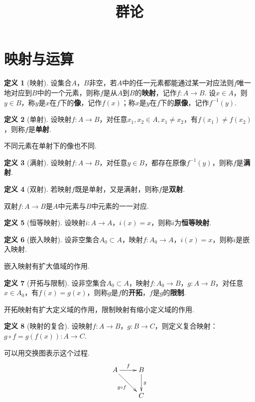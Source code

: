 \documentclass[12pt]{ctexart}
\title{\textbf{群论}}
\date{ }
\theoremstyle{definition}
\newtheorem{definition}{定义}[section]
\theoremstyle{plain}
\begin{document}
	\maketitle
	\tableofcontents
	\newpage
\section{映射与运算}
\begin{definition}[映射]
	设集合$A$，$B$非空，若$A$中的任一元素都能通过某一对应法则$f$唯一地对应到$B$中的一个元素，则称$f$是从$A$到$B$的\textbf{映射}，记作$f:A\to B$. 设$x\in A$，则$y\in B$，称$y$是$x$在$f$下的\textbf{像}，记作$f(x)$；称$x$是$y$在$f$下的\textbf{原像}，记作$f^{-1}(y)$.
\end{definition}
\begin{definition}[单射]
	设映射$f:A\to B$，对任意$x_1,x_2\in A,x_1\neq x_2$，有$f(x_1)\neq f(x_2)$，则称$f$是\textbf{单射}.
\end{definition}
不同元素在单射下的像也不同.
\begin{definition}[满射]
	设映射$f:A\to B$，对任意$y\in B$，都存在原像$f^{-1}(y)$，则称$f$是\textbf{满射}.
\end{definition}
\begin{definition}[双射]
	若映射$f$既是单射，又是满射，则称$f$是\textbf{双射}.
\end{definition}
双射$f:A\to B$是$A$中元素与$B$中元素的一一对应.
\begin{definition}[恒等映射]
	设映射$i:A\to A$，$i(x)=x$，则称$i$为\textbf{恒等映射}.
\end{definition}
\begin{definition}[嵌入映射]
	设非空集合$A_0\subset A$，映射$f:A_0\to A$，$i(x)=x$，则称$i$是嵌入映射.
\end{definition}
嵌入映射有扩大值域的作用.
\begin{definition}[开拓与限制]
	设非空集合$A_0\subset A$，映射$f:A_0\to B$，$g:A\to B$，对任意$x\in A_0$，有$f(x)=g(x)$，则称$g$是$f$的\textbf{开拓}，$f$是$g$的\textbf{限制}.
\end{definition}
开拓映射有扩大定义域的作用，限制映射有缩小定义域的作用.
\begin{definition}[映射的复合]
	设映射$f:A\to B$，$g:B\to C$，则定义复合映射：$g\circ f=g\left(f\left(x\right)\right):A\to C$.
\end{definition}
可以用交换图表示这个过程.
\begin{displaymath}
	\xymatrix{
		A\ar[r]^f \ar[dr]_{g\circ f} & B\ar[d]^g\\
		& C\\
	}
\end{displaymath}
\end{document}
